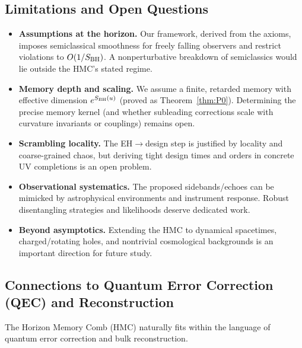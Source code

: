 \documentclass[11pt,a4paper]{article}
\newcommand{\HMC}{\textsc{HMC}\xspace}
\theoremstyle{plain}
\theoremstyle{definition}
\theoremstyle{remark}
\begin{document}
\subsection{Limitations and Open Questions}
\label{sec:limitations-oq}
\begin{itemize}[leftmargin=*]
    \item \textbf{Assumptions at the horizon.} Our framework, derived from the axioms, imposes semiclassical
    smoothness for freely falling observers and restrict violations to
    \(O(1/S_{\rm BH})\). A nonperturbative breakdown of semiclassics would lie
    outside the \HMC{}'s stated regime.
    \item \textbf{Memory depth and scaling.} We assume a finite, retarded memory with
    effective dimension \(e^{S_{\rm BH}(u)}\) (proved as Theorem~\ref{thm:P0}). Determining the precise memory kernel
    (and whether subleading corrections scale with curvature invariants or
    couplings) remains open.
    \item \textbf{Scrambling locality.} The EH\(\rightarrow\)design step is justified by
    locality and coarse-grained chaos, but deriving tight design times and orders
    in concrete UV completions is an open problem.
    \item \textbf{Observational systematics.} The proposed sidebands/echoes can be
    mimicked by astrophysical environments and instrument response. Robust
    disentangling strategies and likelihoods deserve dedicated work.
    \item \textbf{Beyond asymptotics.} Extending the \HMC{} to dynamical spacetimes,
    charged/rotating holes, and nontrivial cosmological backgrounds is an
    important direction for future study.
\end{itemize}


\subsection{Connections to Quantum Error Correction (QEC) and Reconstruction}
\label{subsec:qec}
The Horizon Memory Comb (\HMC{}) naturally fits within the language of quantum error correction and bulk reconstruction.
\end{document}
